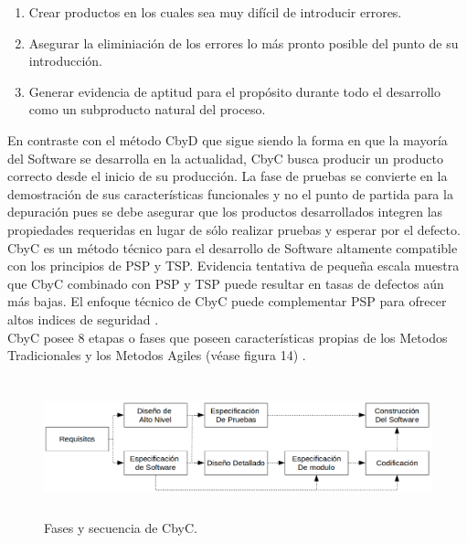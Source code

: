 \documentclass[runningheads,a4paper]{llncs}
\begin{document}
\begin{enumerate}
	\item Crear productos en los cuales sea muy difícil de introducir errores.
	\item Asegurar la eliminiación de los errores lo más pronto posible del punto de su introducción.
	\item Generar evidencia de aptitud para el propósito durante todo el desarrollo como un subproducto natural del proceso.
\end{enumerate}

En contraste con el método \gls{CbyD} que sigue siendo la forma en que la mayoría del \gls{Software} se desarrolla en la actualidad, \gls{CbyC} busca producir un producto correcto desde el inicio de su producción. La fase de pruebas se convierte en la demostración de sus características funcionales y no el punto de partida para la depuración pues se debe asegurar que los productos desarrollados integren las propiedades requeridas en lugar de sólo realizar pruebas y esperar por el defecto. \gls{CbyC} es un método técnico para el desarrollo de \gls{Software} altamente compatible con los principios de \gls{PSP} y \gls{TSP}. Evidencia tentativa de pequeña escala muestra que \gls{CbyC} combinado con \gls{PSP} y \gls{TSP} puede resultar en tasas de defectos aún más bajas. El enfoque técnico de \gls{CbyC} puede complementar \gls{PSP} para ofrecer altos indices de seguridad \cite{CbyCIntroduction}.\\ 

\gls{CbyC} posee 8 etapas o fases que poseen características propias de los \gls{Metodos Tradicionales} y los \gls{Metodos Agiles} (véase figura 14) \cite{CbyCBrito}. 

\begin{figure}
\centering
\includegraphics[height=4.0cm, width=12.0cm]{sa_figura_15}
\caption{Fases y secuencia de \gls{CbyC}.}
\label{fig:example}
\end{figure}
\end{document}
